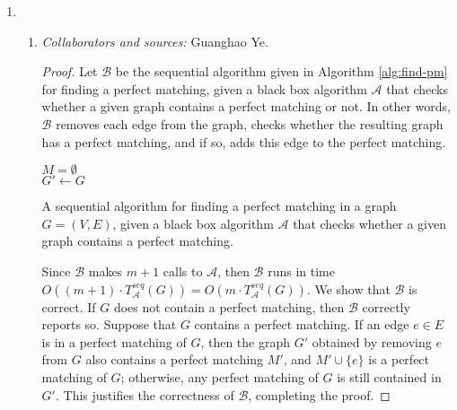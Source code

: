 \documentclass[letterpaper, reqno,11pt]{article}
\begin{document}
\begin{enumerate}
  \clearpage
  
  \item \begin{enumerate}
    \item \noindent\emph{Collaborators and sources:} Guanghao Ye.

    \bigskip

    \begin{proof}
      Let $\mathcal B$ be the sequential algorithm given in Algorithm \ref{alg:find-pm} for finding a perfect matching, given a black box algorithm $\mathcal A$ that checks whether a given graph contains a perfect matching or not. In other words, $\mathcal B$ removes each edge from the graph, checks whether the resulting graph has a perfect matching, and if so, adds this edge to the perfect matching.

      \begin{algorithm}
        $M = \emptyset$ \\
        $G' \leftarrow G$ \\
        \caption{A sequential algorithm for finding a perfect matching in a graph $G = (V, E)$, given a black box algorithm $\mathcal A$ that checks whether a given graph contains a perfect matching.}
        \label{alg:find-pm}
      \end{algorithm}

      Since $\mathcal B$ makes $m + 1$ calls to $\mathcal A$, then $\mathcal B$ runs in time $O((m + 1) \cdot T_{\mathcal A}^\textit{seq}(G)) = O(m \cdot T_{\mathcal A}^\textit{seq}(G))$. We show that $\mathcal B$ is correct. If $G$ does not contain a perfect matching, then $\mathcal B$ correctly reports so. Suppose that $G$ contains a perfect matching. If an edge $e \in E$ is in a perfect matching of $G$, then the graph $G'$ obtained by removing $e$ from $G$ also contains a perfect matching $M'$, and $M' \cup \{ e \}$ is a perfect matching of $G$; otherwise, any perfect matching of $G$ is still contained in $G'$. This justifies the correctness of $\mathcal B$, completing the proof.
    \end{proof}
  \end{enumerate}
\end{enumerate}
\end{document}
